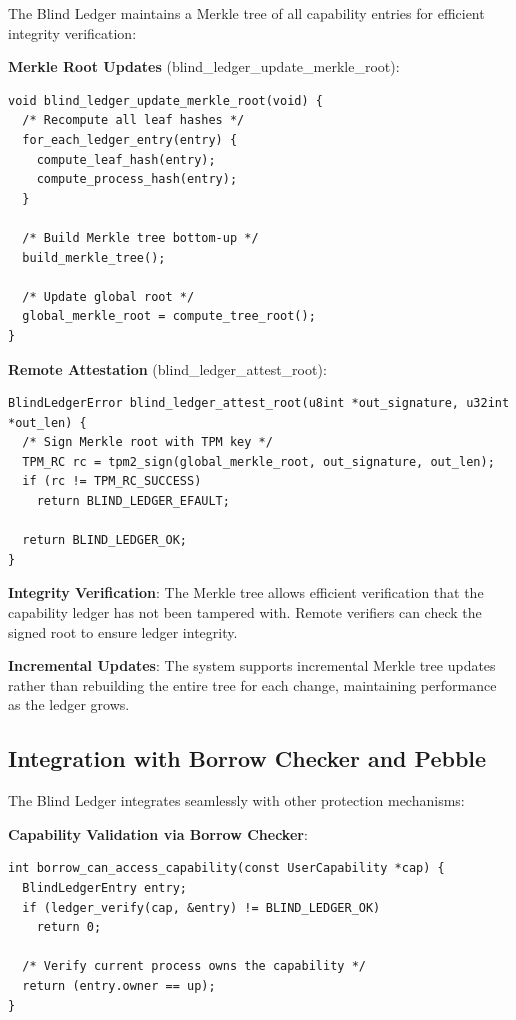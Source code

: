 \documentclass[11pt,letterpaper]{article}
\begin{document}
The Blind Ledger maintains a Merkle tree of all capability entries for efficient integrity verification:

\textbf{Merkle Root Updates} (blind\_ledger\_update\_merkle\_root):

\begin{lstlisting}
void blind_ledger_update_merkle_root(void) {
  /* Recompute all leaf hashes */
  for_each_ledger_entry(entry) {
    compute_leaf_hash(entry);
    compute_process_hash(entry);
  }
  
  /* Build Merkle tree bottom-up */
  build_merkle_tree();
  
  /* Update global root */
  global_merkle_root = compute_tree_root();
}
\end{lstlisting}

\textbf{Remote Attestation} (blind\_ledger\_attest\_root):

\begin{lstlisting}
BlindLedgerError blind_ledger_attest_root(u8int *out_signature, u32int *out_len) {
  /* Sign Merkle root with TPM key */
  TPM_RC rc = tpm2_sign(global_merkle_root, out_signature, out_len);
  if (rc != TPM_RC_SUCCESS)
    return BLIND_LEDGER_EFAULT;
    
  return BLIND_LEDGER_OK;
}
\end{lstlisting}

\textbf{Integrity Verification}: The Merkle tree allows efficient verification that the capability ledger has not been tampered with. Remote verifiers can check the signed root to ensure ledger integrity.

\textbf{Incremental Updates}: The system supports incremental Merkle tree updates rather than rebuilding the entire tree for each change, maintaining performance as the ledger grows.

\subsection{Integration with Borrow Checker and Pebble}

The Blind Ledger integrates seamlessly with other protection mechanisms:

\textbf{Capability Validation via Borrow Checker}:

\begin{lstlisting}
int borrow_can_access_capability(const UserCapability *cap) {
  BlindLedgerEntry entry;
  if (ledger_verify(cap, &entry) != BLIND_LEDGER_OK)
    return 0;
    
  /* Verify current process owns the capability */
  return (entry.owner == up);
}
\end{lstlisting}
\end{document}
